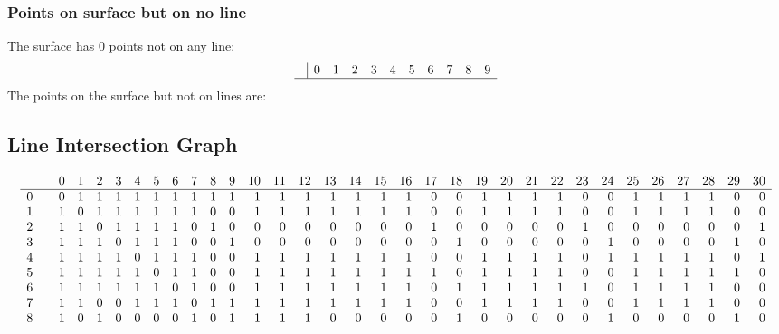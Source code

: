 \documentclass{article}
\begin{document}
{\subsubsection*{Points on surface but on no line}
The surface has 0 points not on any line:\\
$$
\begin{array}{r|*{10}{r}}
 & 0 & 1 & 2 & 3 & 4 & 5 & 6 & 7 & 8 & 9\\
\hline
\end{array}
$$
The points on the surface but not on lines are:\\
\begin{multicols}{2}
\noindent
\end{multicols}
\subsection*{Line Intersection Graph}
{\arraycolsep=1pt
$$
\begin{array}{rr|*{31}r}
 &  & 0 & 1 & 2 & 3 & 4 & 5 & 6 & 7 & 8 & 9 & 10 & 11 & 12 & 13 & 14 & 15 & 16 & 17 & 18 & 19 & 20 & 21 & 22 & 23 & 24 & 25 & 26 & 27 & 28 & 29 & 30\\
\hline
0 &  & 0 & 1 & 1 & 1 & 1 & 1 & 1 & 1 & 1 & 1 & 1 & 1 & 1 & 1 & 1 & 1 & 1 & 0 & 0 & 1 & 1 & 1 & 1 & 0 & 0 & 1 & 1 & 1 & 1 & 0 & 0\\
1 &  & 1 & 0 & 1 & 1 & 1 & 1 & 1 & 1 & 0 & 0 & 1 & 1 & 1 & 1 & 1 & 1 & 1 & 0 & 0 & 1 & 1 & 1 & 1 & 0 & 0 & 1 & 1 & 1 & 1 & 0 & 0\\
2 &  & 1 & 1 & 0 & 1 & 1 & 1 & 1 & 0 & 1 & 0 & 0 & 0 & 0 & 0 & 0 & 0 & 0 & 1 & 0 & 0 & 0 & 0 & 0 & 1 & 0 & 0 & 0 & 0 & 0 & 0 & 1\\
3 &  & 1 & 1 & 1 & 0 & 1 & 1 & 1 & 0 & 0 & 1 & 0 & 0 & 0 & 0 & 0 & 0 & 0 & 0 & 1 & 0 & 0 & 0 & 0 & 0 & 1 & 0 & 0 & 0 & 0 & 1 & 0\\
4 &  & 1 & 1 & 1 & 1 & 0 & 1 & 1 & 1 & 0 & 0 & 1 & 1 & 1 & 1 & 1 & 1 & 1 & 0 & 0 & 1 & 1 & 1 & 1 & 0 & 1 & 1 & 1 & 1 & 1 & 0 & 1\\
5 &  & 1 & 1 & 1 & 1 & 1 & 0 & 1 & 1 & 0 & 0 & 1 & 1 & 1 & 1 & 1 & 1 & 1 & 1 & 0 & 1 & 1 & 1 & 1 & 0 & 0 & 1 & 1 & 1 & 1 & 1 & 0\\
6 &  & 1 & 1 & 1 & 1 & 1 & 1 & 0 & 1 & 0 & 0 & 1 & 1 & 1 & 1 & 1 & 1 & 1 & 0 & 1 & 1 & 1 & 1 & 1 & 1 & 0 & 1 & 1 & 1 & 1 & 0 & 0\\
7 &  & 1 & 1 & 0 & 0 & 1 & 1 & 1 & 0 & 1 & 1 & 1 & 1 & 1 & 1 & 1 & 1 & 1 & 0 & 0 & 1 & 1 & 1 & 1 & 0 & 0 & 1 & 1 & 1 & 1 & 0 & 0\\
8 &  & 1 & 0 & 1 & 0 & 0 & 0 & 0 & 1 & 0 & 1 & 1 & 1 & 1 & 0 & 0 & 0 & 0 & 0 & 1 & 0 & 0 & 0 & 0 & 0 & 1 & 0 & 0 & 0 & 0 & 1 & 0\\

\end{array}$$}}
\end{document}
